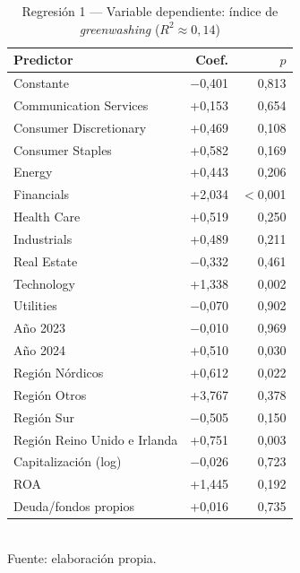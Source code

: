 \begin{table}[H]
\centering
\caption{Regresión 1 --- Variable dependiente: índice de \textit{greenwashing} ($R^2\approx0{,}14$)}
\label{tab:reg1-full}
\begin{tabular}{lrr}
\toprule
\textbf{Predictor} & \textbf{Coef.} & \textbf{$p$} \\
\midrule
Constante & $-$0,401 & 0,813 \\
Communication Services & +0,153 & 0,654 \\
Consumer Discretionary & +0,469 & 0,108 \\
Consumer Staples & +0,582 & 0,169 \\
Energy & +0,443 & 0,206 \\
Financials & +2,034 & $<$0,001 \\
Health Care & +0,519 & 0,250 \\
Industrials & +0,489 & 0,211 \\
Real Estate & $-$0,332 & 0,461 \\
Technology & +1,338 & 0,002 \\
Utilities & $-$0,070 & 0,902 \\
Año 2023 & $-$0,010 & 0,969 \\
Año 2024 & +0,510 & 0,030 \\
Región Nórdicos & +0,612 & 0,022 \\
Región Otros & +3,767 & 0,378 \\
Región Sur & $-$0,505 & 0,150 \\
Región Reino Unido e Irlanda & +0,751 & 0,003 \\
Capitalización (log) & $-$0,026 & 0,723 \\
ROA & +1,445 & 0,192 \\
Deuda/fondos propios & +0,016 & 0,735 \\
\bottomrule
\end{tabular}
\\[4pt]
{\footnotesize Fuente: elaboración propia.}
\end{table}

